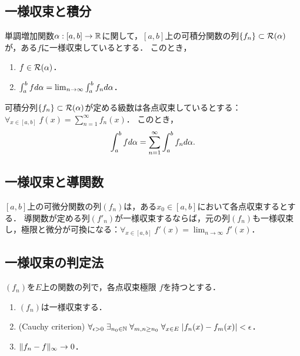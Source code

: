 \documentclass[uplatex, dvipdfmx]{jsreport}
\begin{document}
\subsection{一様収束と積分}

\begin{theorem}
    単調増加関数$\alpha:[a,b]\to\mathbb{R}$に関して，$[a,b]$上の可積分関数の列$\{f_n\}\subset\mathcal{R}(\alpha)$が，ある$f$に一様収束しているとする．
    このとき，
    \begin{enumerate}
        \item $f\in\mathcal{R}(\alpha)$．
        \item $\int^b_afd\alpha=\lim_{n\to\infty}\int^b_af_nd\alpha$．
    \end{enumerate}
\end{theorem}

\begin{corollary}[項別積分]
    可積分列$\{f_n\}\subset\mathcal{R}(\alpha)$が定める級数は各点収束しているとする：$\forall_{x\in[a,b]}\;f(x)=\sum^\infty_{n=1}f_n(x)$．
    このとき，
    \[\int^b_afd\alpha=\sum^\infty_{n=1}\int^b_af_nd\alpha.\]
\end{corollary}

\subsection{一様収束と導関数}

\begin{theorem}
    $[a,b]$上の可微分関数の列$(f_n)$は，ある$x_0\in[a,b]$において各点収束するとする．
    導関数が定める列$(f'_n)$が一様収束するならば，元の列$(f_n)$も一様収束し，極限と微分が可換になる：$\forall_{x\in[a,b]}\;f'(x)=\lim_{n\to\infty}f'(x)$．
\end{theorem}

\subsection{一様収束の判定法}

\begin{proposition}[一様収束の判定法]
    $(f_n)$を$E$上の関数の列で，各点収束極限
    $f$を持つとする．
    \begin{enumerate}
        \item $(f_n)$は一様収束する．
        \item (Cauchy criterion) $\forall_{\epsilon>0}\;\exists_{n_0\in\mathbb{N}}\;\forall_{m,n\ge n_0}\;\forall_{x\in E}\;\lvert f_n(x)-f_m(x)\rvert<\epsilon$．
        \item $\|f_n-f\|_\infty\to0$．
    \end{enumerate}
\end{proposition}
\end{document}
